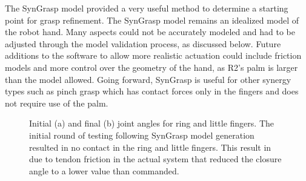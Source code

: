 \documentclass[runningheads,a4paper]{llncs}
\begin{document}

The SynGrasp model provided a very useful method to determine a starting point for grasp refinement. The SynGrasp model remains an idealized model of the robot hand. Many aspects could not be accurately modeled and had to be adjusted through the model validation process, as discussed below. Future additions to the software to allow more realistic actuation could include friction models and more control over the geometry of the hand, as R2's palm is larger than the model allowed. Going forward, SynGrasp is useful for other synergy types such as pinch grasp which has contact forces only in the fingers and does not require use of the palm. 

\begin{figure}[!b]
\centering
\null\hfill
	\quad
	\hfill
	\hfill\null
  \caption{Initial (a) and final (b) joint angles for ring and little fingers. The initial round of testing following SynGrasp model generation resulted in no contact in the ring and little fingers.  This result in due to tendon friction in the actual system that reduced the closure angle to a lower value than commanded.}%
\label{pinkymodels}%
\end{figure}
\end{document}
